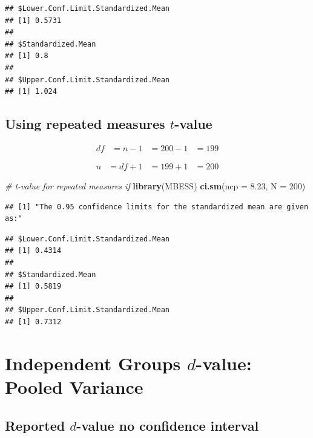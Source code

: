\documentclass[
]{krantz}
\makeatletter
\newenvironment{Shaded}{\begin{snugshade}}{\end{snugshade}}
\newcommand{\CommentTok}[1]{\textcolor[rgb]{0.37,0.37,0.37}{\textit{#1}}}
\newcommand{\DataTypeTok}[1]{\textcolor[rgb]{0.27,0.27,0.27}{#1}}
\newcommand{\DecValTok}[1]{\textcolor[rgb]{0.06,0.06,0.06}{#1}}
\newcommand{\FloatTok}[1]{\textcolor[rgb]{0.06,0.06,0.06}{#1}}
\newcommand{\KeywordTok}[1]{\textcolor[rgb]{0.27,0.27,0.27}{\textbf{#1}}}
\newcommand{\NormalTok}[1]{#1}
\newenvironment{kframe}{%
\medskip{}
\setlength{\fboxsep}{.8em}
 \def\at@end@of@kframe{}%
 \ifinner\ifhmode%
  \def\at@end@of@kframe{\end{minipage}}%
  \begin{minipage}{\columnwidth}%
 \fi\fi%
 \def\FrameCommand##1{\hskip\@totalleftmargin \hskip-\fboxsep
 \colorbox{shadecolor}{##1}\hskip-\fboxsep
     \hskip-\linewidth \hskip-\@totalleftmargin \hskip\columnwidth}%
 \MakeFramed {\advance\hsize-\width
   \@totalleftmargin\z@ \linewidth\hsize
   \@setminipage}}%
 {\par\unskip\endMakeFramed%
 \at@end@of@kframe}
\renewenvironment{Shaded}{\begin{kframe}}{\end{kframe}}
\makeatother
\begin{document}
\begin{verbatim}
## $Lower.Conf.Limit.Standardized.Mean
## [1] 0.5731
## 
## $Standardized.Mean
## [1] 0.8
## 
## $Upper.Conf.Limit.Standardized.Mean
## [1] 1.024
\end{verbatim}

\hypertarget{using-repeated-measures-t-value}{%
\subsection{\texorpdfstring{Using repeated measures \(t\)-value}{Using repeated measures t-value}}\label{using-repeated-measures-t-value}}

\[
\begin{aligned}
df &= n - 1
&= 200 - 1
&= 199
\end{aligned}
\]

\[
\begin{aligned}
n  &= df + 1
&= 199 + 1
&= 200
\end{aligned}
\]

\begin{Shaded}
\begin{Highlighting}[]
\CommentTok{# t-value for repeated measures if }
\KeywordTok{library}\NormalTok{(MBESS)}
\KeywordTok{ci.sm}\NormalTok{(}\DataTypeTok{ncp =} \FloatTok{8.23}\NormalTok{, }\DataTypeTok{N =} \DecValTok{200}\NormalTok{)}
\end{Highlighting}
\end{Shaded}

\begin{verbatim}
## [1] "The 0.95 confidence limits for the standardized mean are given as:"
\end{verbatim}

\begin{verbatim}
## $Lower.Conf.Limit.Standardized.Mean
## [1] 0.4314
## 
## $Standardized.Mean
## [1] 0.5819
## 
## $Upper.Conf.Limit.Standardized.Mean
## [1] 0.7312
\end{verbatim}

\hypertarget{independent-groups-d-value-pooled-variance}{%
\section{\texorpdfstring{Independent Groups \(d\)-value: Pooled Variance}{Independent Groups d-value: Pooled Variance}}\label{independent-groups-d-value-pooled-variance}}

\hypertarget{reported-d-value-no-confidence-interval}{%
\subsection{\texorpdfstring{Reported \(d\)-value no confidence interval}{Reported d-value no confidence interval}}\label{reported-d-value-no-confidence-interval}}
\end{document}
